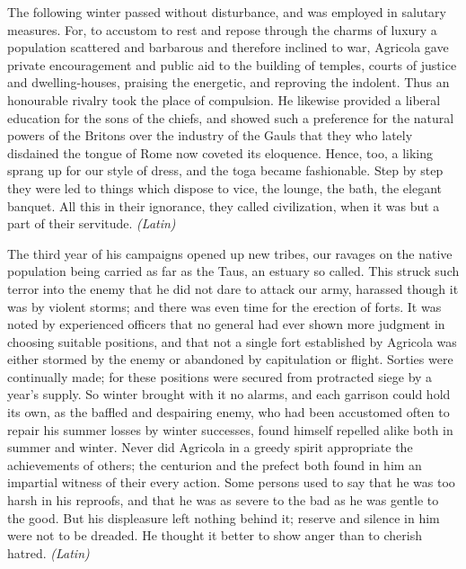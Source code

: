 
The following winter passed without disturbance, and was employed in salutary measures. For, to accustom to rest and repose through the charms of luxury a population scattered and barbarous and therefore inclined to war, Agricola gave private encouragement and public aid to the building of temples, courts of justice and dwelling-houses, praising the energetic, and reproving the indolent. Thus an honourable rivalry took the place of compulsion. He likewise provided a liberal education for the sons of the chiefs, and showed such a preference for the natural powers of the Britons over the industry of the Gauls that they who lately disdained the tongue of Rome now coveted its eloquence. Hence, too, a liking sprang up for our style of dress, and the toga became fashionable. Step by step they were led to things which dispose to vice, the lounge, the bath, the elegant banquet. All this in their ignorance, they called civilization, when it was but a part of their servitude. \emph{(Latin)}


The third year of his campaigns opened up new tribes, our ravages on the native population being carried as far as the Taus, an estuary so called. This struck such terror into the enemy that he did not dare to attack our army, harassed though it was by violent storms; and there was even time for the erection of forts. It was noted by experienced officers that no general had ever shown more judgment in choosing suitable positions, and that not a single fort established by Agricola was either stormed by the enemy or abandoned by capitulation or flight. Sorties were continually made; for these positions were secured from protracted siege by a year's supply. So winter brought with it no alarms, and each garrison could hold its own, as the baffled and despairing enemy, who had been accustomed often to repair his summer losses by winter successes, found himself repelled alike both in summer and winter. Never did Agricola in a greedy spirit appropriate the achievements of others; the centurion and the prefect both found in him an impartial witness of their every action. Some persons used to say that he was too harsh in his reproofs, and that he was as severe to the bad as he was gentle to the good. But his displeasure left nothing behind it; reserve and silence in him were not to be dreaded. He thought it better to show anger than to cherish hatred. \emph{(Latin)}


